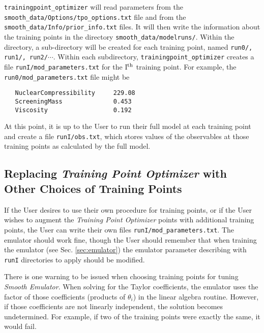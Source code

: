 \documentclass[UserManual.tex]{subfiles}
\begin{document}
{\tt trainingpoint\_optimizer} will read parameters from the {\tt smooth\_data/Options/tpo\_options.txt} file and from the {\tt smooth\_data/Info/prior\_info.txt} files. It will then write the information about the training points in the directory {\tt smooth\_data/modelruns/}. Within the directory, a sub-directory will be created for each training point, named {\tt run0/, run1/, run2/}$\cdots$. Within each subdirectory, {\tt trainingpoint\_optimizer} creates a file {\tt runI/mod\_parameters.txt} for the I$^{\rm th}$ training point. For example, the {\tt run0/mod\_parameters.txt} file might be
{\tt\begin{verbatim}
   NuclearCompressibility     229.08
   ScreeningMass              0.453
   Viscosity                  0.192
\end{verbatim}
}
At this point, it is up to the User to run their full model at each training point and create a file {\tt runI/obs.txt}, which stores values of the observables at those training points as calculated by the full model. 

\subsection{Replacing {\it Training Point Optimizer} with Other Choices of Training Points}

If the User desires to use their own procedure for training points, or if the User wishes to augment the {\it Training Point Optimizer} points with additional training points, the User can write their own files {\tt runI/mod\_parameters.txt}. The emulator should work fine, though the User should remember that when training the emulator (see Sec. \ref{sec:emulator}) the emulator parameter describing with {\tt runI} directories to apply should be modified.

There is one warning to be issued when choosing training points for tuning {\it Smooth Emulator}. When solving for the Taylor coefficients, the emulator uses the factor of those coefficients (products of $\theta_i$) in the linear algebra routine. However, if those coefficients are not linearly independent, the solution becomes undetermined. For example, if two of the training points were exactly the same, it would fail. 
\end{document}
